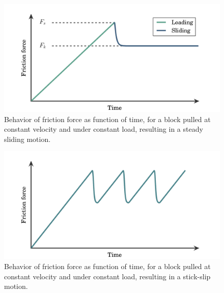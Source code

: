 \documentclass[twoside,english]{uiofysmaster}
\begin{document}
 
\newpage
\begin{figure}[H]
	\centering
	\includegraphics[width=0.7\linewidth]{figures/friction/steadySlide}
	\caption{Behavior of friction force as function of time, for a block pulled at constant velocity and under constant load, resulting in a steady sliding motion.}
	\label{fig:steadyslide}
\end{figure}
\begin{figure}[H]
	\centering
	\includegraphics[width=0.7\linewidth]{figures/friction/stick-slip}
	\caption{Behavior of friction force as function of time, for a block pulled at constant velocity and under constant load, resulting in a stick-slip motion.}
	\label{fig:stick-slip}
\end{figure}
\begin{figure}[H]
\end{figure}







\end{document}
